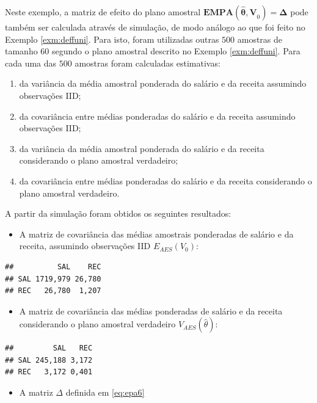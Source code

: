 \documentclass[]{book}
\providecommand{\tightlist}{%
  \setlength{\itemsep}{0pt}\setlength{\parskip}{0pt}}
\theoremstyle{definition}
\theoremstyle{definition}
\theoremstyle{definition}
\theoremstyle{remark}
\begin{document}
Neste exemplo, a matriz de efeito do plano amostral
\(\mathbf{EMPA}(\mathbf{\hat{\theta},V}_{0})=\mathbf{\Delta }\) pode
também ser calculada através de simulação, de modo análogo ao que foi
feito no Exemplo \ref{exm:deffuni}. Para isto, foram utilizadas outras
\(500\) amostras de tamanho \(60\) segundo o plano amostral descrito no
Exemplo \ref{exm:deffuni}. Para cada uma das \(500\) amostras foram
calculadas estimativas:

\begin{enumerate}
\def\labelenumi{\arabic{enumi}.}
\item
  da variância da média amostral ponderada do salário e da receita
  assumindo observações IID;
\item
  da covariância entre médias ponderadas do salário e da receita
  assumindo observações IID;
\item
  da variância da média amostral ponderada do salário e da receita
  considerando o plano amostral verdadeiro;
\item
  da covariância entre médias ponderadas do salário e da receita
  considerando o plano amostral verdadeiro.
\end{enumerate}

A partir da simulação foram obtidos os seguintes resultados:

\begin{itemize}
\tightlist
\item
  A matriz de covariância das médias amostrais ponderadas de salário e
  da receita, assumindo observações IID \(E_{AES}\left(V_{0}\right)\):
\end{itemize}

\begin{verbatim}
##          SAL    REC
## SAL 1719,979 26,780
## REC   26,780  1,207
\end{verbatim}

\begin{itemize}
\tightlist
\item
  A matriz de covariância das médias ponderadas de salário e da receita
  considerando o plano amostral verdadeiro
  \(V_{AES}\left(\hat{\theta}\right)\):
\end{itemize}

\begin{verbatim}
##         SAL   REC
## SAL 245,188 3,172
## REC   3,172 0,401
\end{verbatim}

\begin{itemize}
\tightlist
\item
  A matriz \(\Delta\) definida em \eqref{eq:epa6}
\end{itemize}
\end{document}

